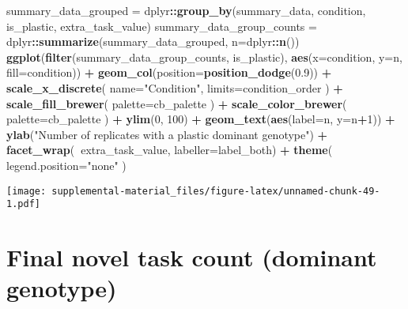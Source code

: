 \documentclass[]{book}
\newenvironment{Shaded}{\begin{snugshade}}{\end{snugshade}}
\newcommand{\DataTypeTok}[1]{\textcolor[rgb]{0.13,0.29,0.53}{#1}}
\newcommand{\DecValTok}[1]{\textcolor[rgb]{0.00,0.00,0.81}{#1}}
\newcommand{\FloatTok}[1]{\textcolor[rgb]{0.00,0.00,0.81}{#1}}
\newcommand{\KeywordTok}[1]{\textcolor[rgb]{0.13,0.29,0.53}{\textbf{#1}}}
\newcommand{\NormalTok}[1]{#1}
\newcommand{\OperatorTok}[1]{\textcolor[rgb]{0.81,0.36,0.00}{\textbf{#1}}}
\newcommand{\StringTok}[1]{\textcolor[rgb]{0.31,0.60,0.02}{#1}}
\begin{document}
\begin{Shaded}
\begin{Highlighting}[]
\NormalTok{summary_data_grouped =}\StringTok{ }\NormalTok{dplyr}\OperatorTok{::}\KeywordTok{group_by}\NormalTok{(summary_data, condition, is_plastic, extra_task_value)}
\NormalTok{summary_data_group_counts =}\StringTok{ }\NormalTok{dplyr}\OperatorTok{::}\KeywordTok{summarize}\NormalTok{(summary_data_grouped, }\DataTypeTok{n=}\NormalTok{dplyr}\OperatorTok{::}\KeywordTok{n}\NormalTok{())}
\KeywordTok{ggplot}\NormalTok{(}\KeywordTok{filter}\NormalTok{(summary_data_group_counts, is_plastic), }\KeywordTok{aes}\NormalTok{(}\DataTypeTok{x=}\NormalTok{condition, }\DataTypeTok{y=}\NormalTok{n, }\DataTypeTok{fill=}\NormalTok{condition)) }\OperatorTok{+}
\StringTok{  }\KeywordTok{geom_col}\NormalTok{(}\DataTypeTok{position=}\KeywordTok{position_dodge}\NormalTok{(}\FloatTok{0.9}\NormalTok{)) }\OperatorTok{+}
\StringTok{  }\KeywordTok{scale_x_discrete}\NormalTok{(}
    \DataTypeTok{name=}\StringTok{"Condition"}\NormalTok{,}
    \DataTypeTok{limits=}\NormalTok{condition_order}
\NormalTok{  ) }\OperatorTok{+}
\StringTok{  }\KeywordTok{scale_fill_brewer}\NormalTok{(}
    \DataTypeTok{palette=}\NormalTok{cb_palette}
\NormalTok{  ) }\OperatorTok{+}
\StringTok{  }\KeywordTok{scale_color_brewer}\NormalTok{(}
    \DataTypeTok{palette=}\NormalTok{cb_palette}
\NormalTok{  ) }\OperatorTok{+}
\StringTok{  }\KeywordTok{ylim}\NormalTok{(}\DecValTok{0}\NormalTok{, }\DecValTok{100}\NormalTok{) }\OperatorTok{+}
\StringTok{  }\KeywordTok{geom_text}\NormalTok{(}\KeywordTok{aes}\NormalTok{(}\DataTypeTok{label=}\NormalTok{n, }\DataTypeTok{y=}\NormalTok{n}\OperatorTok{+}\DecValTok{1}\NormalTok{)) }\OperatorTok{+}
\StringTok{  }\KeywordTok{ylab}\NormalTok{(}\StringTok{"Number of replicates with a plastic dominant genotype"}\NormalTok{) }\OperatorTok{+}
\StringTok{  }\KeywordTok{facet_wrap}\NormalTok{(}\OperatorTok{~}\NormalTok{extra_task_value, }\DataTypeTok{labeller=}\NormalTok{label_both) }\OperatorTok{+}
\StringTok{  }\KeywordTok{theme}\NormalTok{(}
    \DataTypeTok{legend.position=}\StringTok{"none"}
\NormalTok{  )}
\end{Highlighting}
\end{Shaded}

\texttt{[image: supplemental-material\_files/figure-latex/unnamed-chunk-49-1.pdf]}

\hypertarget{final-novel-task-count-dominant-genotype}{%
\section{Final novel task count (dominant genotype)}\label{final-novel-task-count-dominant-genotype}}
\end{document}
